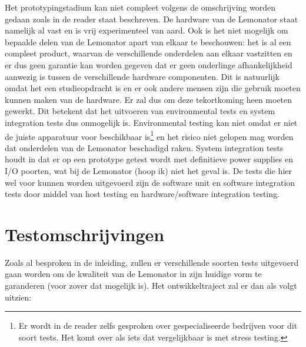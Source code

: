 \documentclass{article}
\begin{document}
	Het prototypingstadium kan niet compleet volgens de omschrijving worden gedaan zoals in de reader staat beschreven. De hardware van de Lemonator staat namelijk al vast en is vrij experimenteel van aard. Ook is het niet mogelijk om bepaalde delen van de Lemonator apart van elkaar te beschouwen: het is al een compleet product, waarvan de verschillende onderdelen aan elkaar vastzitten en er dus geen garantie kan worden gegeven dat er geen onderlinge afhankelijkheid aanwezig is tussen de verschillende hardware componenten. Dit is natuurlijk omdat het een studieopdracht is en er ook andere mensen zijn die gebruik moeten kunnen maken van de hardware. Er zal dus om deze tekortkoming heen moeten gewerkt. Dit betekent dat het uitvoeren van environmental tests en system integration tests dus onmogelijk is. Environmental testing kan niet omdat er niet de juiste apparatuur voor beschikbaar is\footnote{Er wordt in de reader zelfs gesproken over gespecialiseerde bedrijven voor dit soort tests. Het komt over als iets dat vergelijkbaar is met stress testing.} en het risico niet gelopen mag worden dat onderdelen van de Lemonator beschadigd raken. System integration tests houdt in dat er op een prototype getest wordt met definitieve power supplies en I/O poorten, wat bij de Lemonator (hoop ik) niet het geval is. De tests die hier wel voor kunnen worden uitgevoerd zijn de software unit en software integration tests door middel van host testing en hardware/software integration testing.
	
	\section{Testomschrijvingen}
	Zoals al besproken in de inleiding, zullen er verschillende soorten tests uitgevoerd gaan worden om de kwaliteit van de Lemonator in zijn huidige vorm te garanderen (voor zover dat mogelijk is). Het ontwikkeltraject zal er dan als volgt uitzien:
	
\end{document}
